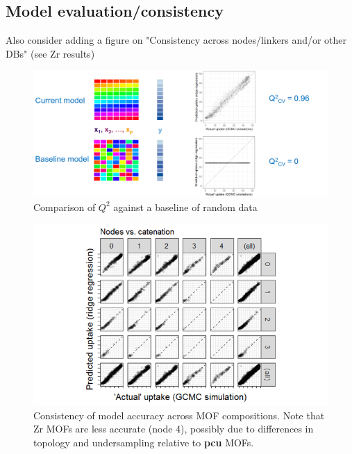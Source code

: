\documentclass[letterpaper]{article}
\begin{document}
\subsection{Model evaluation/consistency}

Also consider adding a figure on "Consistency across nodes/linkers and/or other DBs" (see Zr results)

\begin{figure}[H]
	\centering
	\includegraphics[width=0.75\columnwidth]{Figs/random_baseline.png}
	\caption{Comparison of $Q^2$ against a baseline of random data}
	\label{fig:q2_baseline}
\end{figure}

\begin{figure}[H]
	\centering
	\includegraphics[width=0.75\columnwidth]{Figs/consistency_across_compositions_p.png}
	\caption{Consistency of model accuracy across MOF compositions.  Note that Zr MOFs are less accurate (node 4), possibly due to differences in topology and undersampling relative to \textbf{pcu} MOFs.}
	\label{fig:nodes_vs_cat}
\end{figure}
\end{document}
